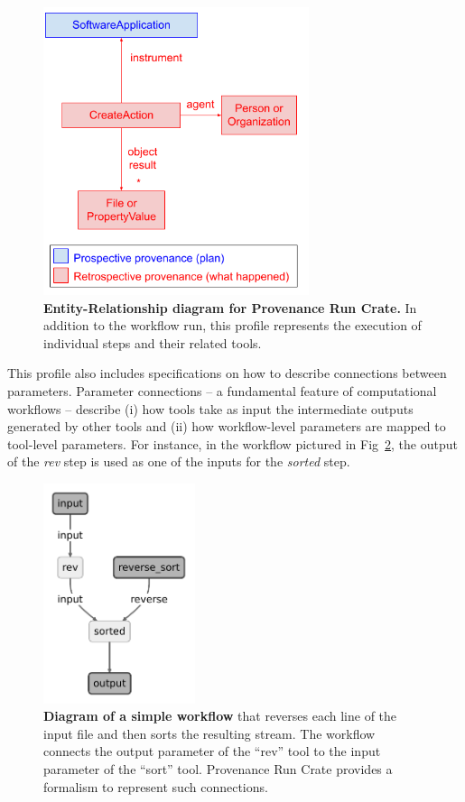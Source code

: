 \documentclass[10pt,letterpaper]{article}
\begin{document}
\begin{figure}[!h]
\includegraphics[width=21em]{image4.png}
\caption{{\bf Entity-Relationship diagram for Provenance Run Crate.}
In addition to the workflow run, this profile represents the execution of individual steps and their related tools.}
\label{fig:provenance_crate_er}
\end{figure}

This profile also includes specifications on how to describe connections between parameters.
Parameter connections -- a fundamental feature of computational workflows -- describe (i) how tools take as input the intermediate outputs generated by other tools and (ii) how workflow-level parameters are mapped to tool-level parameters.
For instance, in the workflow pictured in Fig~\ref{fig:revsort}, the output of the \emph{rev} step is used as one of the inputs for the \emph{sorted}
step.

\begin{figure}[!h]
\includegraphics[width=12em]{image5.png}
\caption{{\bf Diagram of a simple workflow}
that reverses each line of the input file and then sorts the resulting stream.
The workflow connects the output parameter of the ``rev'' tool to the input parameter of the ``sort'' tool.
Provenance Run Crate provides a formalism to represent such connections.}
\label{fig:revsort}
\end{figure}
\end{document}
